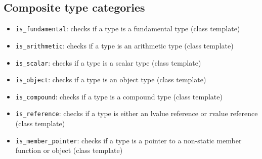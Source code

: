 \documentclass{report}
\begin{document}
        \subsection{Composite type categories}
        \bigbreak \noindent 
        \begin{itemize}
            \item \texttt{is\_fundamental}: checks if a type is a fundamental type (class template)
            \item \texttt{is\_arithmetic}: checks if a type is an arithmetic type (class template)
            \item \texttt{is\_scalar}: checks if a type is a scalar type (class template)
            \item \texttt{is\_object}: checks if a type is an object type (class template)
            \item \texttt{is\_compound}: checks if a type is a compound type (class template)
            \item \texttt{is\_reference}: checks if a type is either an lvalue reference or rvalue reference (class template)
            \item \texttt{is\_member\_pointer}: checks if a type is a pointer to a non-static member function or object (class template)
        \end{itemize}

        \pagebreak 
\end{document}
